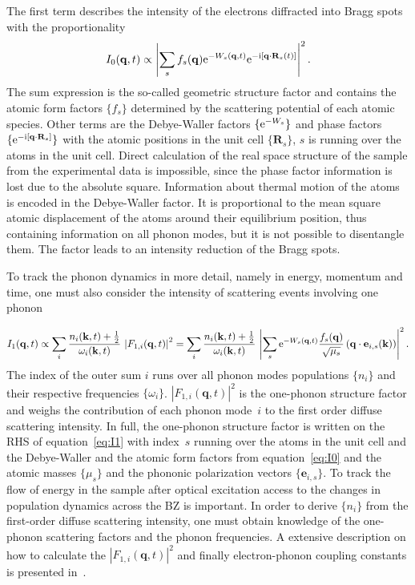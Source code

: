 The first term describes the intensity of the electrons diffracted into Bragg spots with the proportionality
\begin{equation} I_0(\mathbf{q}, t) \propto \left| \sum_s f_s(\mathbf{q}) \mathrm{e}^{-W_s(\mathbf{q},t)} \mathrm{e}^{-\mathrm{i}[\mathbf{q}\cdot\mathbf{R}_s(t)]} \right| ^2.\label{eq:I0}\end{equation}
The sum expression is the so-called geometric structure factor and contains the atomic form factors $\{f_s\}$ determined by the scattering potential of each atomic species.
Other terms are the Debye-Waller factors $\{\mathrm{e}^{-W_s}\}$ and phase factors $\{\mathrm{e}^{-\mathrm{i}[\mathbf{q}\cdot\mathbf{R}_s]}\}$ with the atomic positions in the unit cell $\{\mathbf{R}_s\}$, $s$ is running over the atoms in the unit cell.
Direct calculation of the real space structure of the sample from the experimental data is impossible, since the phase factor information is lost due to the absolute square.
Information about thermal motion of the atoms is encoded in the Debye-Waller factor.
It is proportional to the mean square atomic displacement of the atoms around their equilibrium position, thus containing information on all phonon modes, but it is not possible to disentangle them.
The factor leads to an intensity reduction of the Bragg spots.

To track the phonon dynamics in more detail, namely in energy, momentum and time, one must also consider the intensity of scattering events involving one phonon

\begin{equation} I_1(\mathbf{q},t) \propto \sum_i \frac{n_{i}(\mathbf{k}, t)+\frac{1}{2}}{\omega_{i}(\mathbf{k}, t)}\,\left| F_{1,i}(\mathbf{q},t) \right|^2 = \sum_i \frac{n_{i}(\mathbf{k},t)+\frac{1}{2}}{\omega_{i}(\mathbf{k},t)}\,\left| \sum_s \mathrm{e}^{-W_s(\mathbf{q},t)} \frac{f_s(\mathbf{q})}{\sqrt{\mu_s}} \left(\mathbf{q}\cdot\mathbf{e}_{i, s}(\mathbf{k}) \right) \right|^2.\label{eq:I1}\end{equation}
The index of the outer sum $i$ runs over all phonon modes populations $\{n_{i}\}$ and their respective frequencies $\{\omega_{i}\}$.
$\left| F_{1,i}(\mathbf{q},t) \right|^2$ is the one-phonon structure factor and weighs the contribution of each phonon mode~$i$ to the first order diffuse scattering intensity.
In full, the one-phonon structure factor is written on the RHS of equation~\ref{eq:I1} with index~$s$ running over the atoms in the unit cell and the Debye-Waller and the atomic form factors from equation~\ref{eq:I0} and the atomic masses $\{\mu_s\}$ and the phononic polarization vectors $\{\mathbf{e}_{i, s}\}$.
To track the flow of energy in the sample after optical excitation access to the changes in population dynamics across the \ac{BZ} is important.
In order to derive $\{n_{i}\}$ from the first-order diffuse scattering intensity, one must obtain knowledge of the one-phonon scattering factors and the phonon frequencies.
A extensive description on how to calculate the $\left| F_{1,i}(\mathbf{q},t) \right|^2$ and finally electron-phonon coupling constants is presented in~\cite{stern2018,renedecotret2019}.

